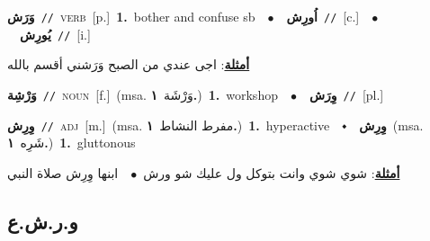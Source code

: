 \documentclass[10pt,a4paper,twoside]{article} %
\begin{document}
\begin{multicols}{2}
{\setlength\topsep{0pt}\textbf{\foreignlanguage{arabic}{وَرَش}}\ {\color{gray}\texttt{//}\color{black}}\ \textsc{verb}\ [p.]\ \textbf{1.}~bother and confuse sb\ \ $\bullet$\ \ \setlength\topsep{0pt}\textbf{\foreignlanguage{arabic}{اُورِش}}\ {\color{gray}\texttt{//}\color{black}}\ [c.]\ \ $\bullet$\ \ \setlength\topsep{0pt}\textbf{\foreignlanguage{arabic}{يُورِش}}\ {\color{gray}\texttt{//}\color{black}}\ [i.]\  \begin{flushright}\color{gray}\foreignlanguage{arabic}{\textbf{\underline{\foreignlanguage{arabic}{أمثلة}}}: اجى عندي من الصبح وَرَشني أقسم بالله}\end{flushright}\color{black}} \vspace{2mm}

{\setlength\topsep{0pt}\textbf{\foreignlanguage{arabic}{وَرْشِة}}\ {\color{gray}\texttt{//}\color{black}}\ \textsc{noun}\ [f.]\ \color{gray}(msa. \foreignlanguage{arabic}{وَرْشَة}~\foreignlanguage{arabic}{\textbf{١.}})\color{black}\ \textbf{1.}~workshop\ \ $\bullet$\ \ \setlength\topsep{0pt}\textbf{\foreignlanguage{arabic}{وِرَش}}\ {\color{gray}\texttt{//}\color{black}}\ [pl.]\ } \vspace{2mm}

{\setlength\topsep{0pt}\textbf{\foreignlanguage{arabic}{وِرِش}}\ {\color{gray}\texttt{//}\color{black}}\ \textsc{adj}\ [m.]\ \color{gray}(msa. \foreignlanguage{arabic}{مفرط النشاط}~\foreignlanguage{arabic}{\textbf{١.}})\color{black}\ \textbf{1.}~hyperactive\ \ $\smblkdiamond$\ \ \setlength\topsep{0pt}\textbf{\foreignlanguage{arabic}{وِرِش}}\ \color{gray}(msa. \foreignlanguage{arabic}{شَرِه}~\foreignlanguage{arabic}{\textbf{١.}})\color{black}\ \textbf{1.}~gluttonous\  \begin{flushright}\color{gray}\foreignlanguage{arabic}{\textbf{\underline{\foreignlanguage{arabic}{أمثلة}}}: شوي شوي وانت بتوكل ول عليك شو ورش\ $\bullet$\ \  ابنها وِرِش صلاة النبي}\end{flushright}\color{black}} \vspace{2mm}

\vspace{-3mm}
\subsection*{\color{blue}\foreignlanguage{arabic}{و.ر.ش.ع}\color{blue}{}} 


\end{multicols}
\end{document}
